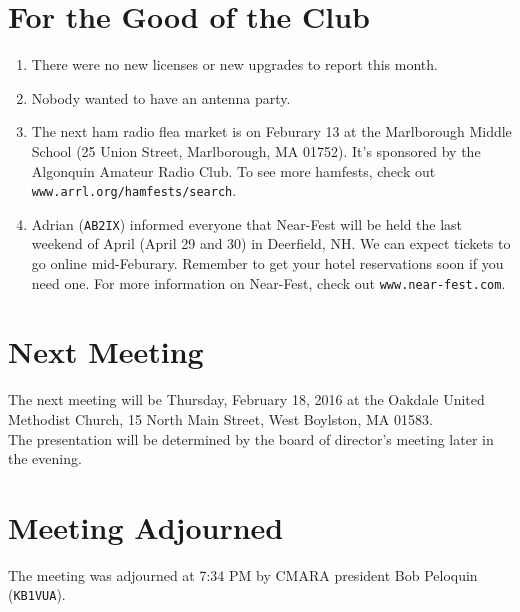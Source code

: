 \documentclass[10pt,letterpaper]{article}
\begin{document}
\section{For the Good of the Club}

\begin{enumerate}

\item There were no new licenses or new upgrades to report this month.

\item Nobody wanted to have an antenna party.

\item The next ham radio flea market is on Feburary 13 at the Marlborough Middle School (25 Union Street, Marlborough, MA 01752). It's sponsored by the Algonquin Amateur Radio Club. To see more hamfests, check out \texttt{www.arrl.org/hamfests/search}.

\item Adrian (\texttt{AB2IX}) informed everyone that Near-Fest will be held the last weekend of April (April 29 and 30) in Deerfield, NH. We can expect tickets to go online mid-Feburary. Remember to get your hotel reservations soon if you need one. For more information on Near-Fest, check out \texttt{www.near-fest.com}.

\end{enumerate}


\section{Next Meeting}

The next meeting will be Thursday, February 18, 2016 at the Oakdale United Methodist Church, 15 North Main Street, West Boylston, MA 01583.\\

\noindent
The presentation will be determined by the board of director's meeting later in the evening.

\section{Meeting Adjourned}
The meeting was adjourned at 7:34 PM by CMARA president Bob Peloquin (\texttt{KB1VUA}).
\end{document}
